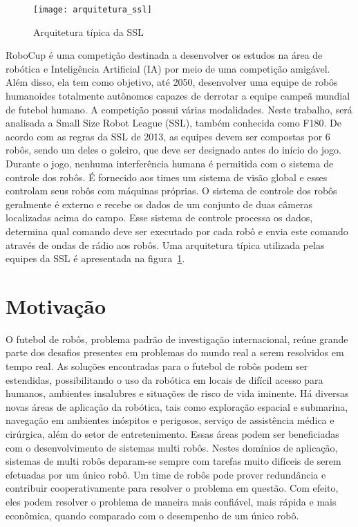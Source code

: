 \begin{figure}
  \centering
  \texttt{[image: arquitetura\_ssl]}
  \caption{Arquitetura típica da SSL}\label{fig:arq_ssl}
\end{figure}

RoboCup é uma competição destinada a desenvolver os estudos na área de robótica
e Inteligência Artificial (IA) por meio de uma competição amigável. Além disso,
ela tem como objetivo, até 2050, desenvolver uma equipe de robôs humanoides
totalmente autônomos capazes de derrotar a equipe campeã mundial de futebol
humano. A competição possui várias modalidades. Neste trabalho, será analisada a
Small Size Robot League (SSL), também conhecida como F180. De acordo com as
regras da SSL de 2013, as equipes devem ser compostas por 6 robôs, sendo um deles o
goleiro, que deve ser designado antes do início do jogo. Durante o jogo, nenhuma
interferência humana é permitida com o sistema de controle dos robôs. É
fornecido aos times um sistema de visão global e esses controlam seus robôs com
máquinas próprias. O sistema de controle dos robôs geralmente é externo e recebe
os dados de um conjunto de duas câmeras localizadas acima do campo. Esse sistema
de controle processa os dados, determina qual comando deve ser executado por
cada robô e envia este comando através de ondas de rádio aos robôs.
Uma arquitetura típica utilizada pelas equipes da SSL é apresentada na
figura~\ref{fig:arq_ssl}.

\section{Motivação}


O futebol de robôs, problema padrão de investigação internacional, reúne grande
parte dos desafios presentes em problemas do mundo real a serem resolvidos em
tempo real. As soluções encontradas para o futebol de robôs podem ser
estendidas, possibilitando o uso da robótica em locais de difícil acesso para
humanos, ambientes insalubres e situações de risco de vida iminente.  Há
diversas novas áreas de aplicação da robótica, tais como exploração espacial e
submarina, navegação em ambientes inóspitos e perigosos, serviço de assistência
médica e cirúrgica, além do setor de entretenimento. Essas áreas podem ser
beneficiadas com o desenvolvimento de sistemas multi robôs. Nestes domínios de
aplicação, sistemas de multi robôs deparam-se sempre com tarefas muito difíceis
de serem efetuadas por um único robô.  Um time de robôs pode prover redundância
e contribuir cooperativamente para resolver o problema em questão. Com efeito,
eles podem resolver o problema de maneira mais confiável, mais rápida e mais
econômica, quando comparado com o desempenho de um único robô.

